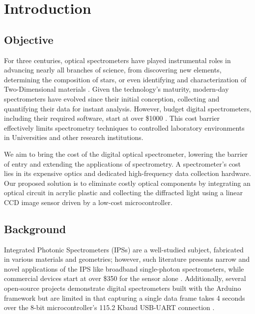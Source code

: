 \documentclass{article}
\begin{document}
\maketitle


\tableofcontents

\section{Introduction}

    \subsection{Objective}
    For three centuries, optical spectrometers have played instrumental roles in advancing nearly all branches of science, from discovering new elements, determining the composition of stars, or even identifying and characterization of Two-Dimensional materials \cite{Weeks1932TheDiscoveries, Loewen1997DiffractionApplications, WhatSpectroscopy}. Given the technology's maturity, modern-day spectrometers have evolved since their initial conception, collecting and quantifying their data for instant analysis. However, budget digital spectrometers, including their required software, start at over \$1000 \cite{OceanSpectrometers}. This cost barrier effectively limits spectrometry techniques to controlled laboratory environments in Universities and other research institutions. 
    
    We aim to bring the cost of the digital optical spectrometer, lowering the barrier of entry and extending the applications of spectrometry. A spectrometer's cost lies in its expensive optics and dedicated high-frequency data collection hardware. Our proposed solution is to eliminate costly optical components by integrating an optical circuit in acrylic plastic and collecting the diffracted light using a linear CCD image sensor driven by a low-cost microcontroller.
     
     
    \subsection{Background}
        Integrated Photonic Spectrometers (IPSs) are a well-studied subject, fabricated in various materials and geometries; however, such literature presents narrow and novel applications of the IPS like broadband single-photon spectrometers, while commercial devices start at over \$350 for the sensor alone \cite{Ma2013, Pottier2014IntegratedInsulator, Cheng2019BroadbandSpectrometer, BO-HAMA-2-C12880MADigiKey}. Additionally, several open-source projects demonstrate digital spectrometers built with the Arduino framework but are limited in that capturing a single data frame takes 4 seconds over the 8-bit microcontroller's 115.2 Kbaud USB-UART connection \cite{CCDAllmon}.
   
\end{document}
